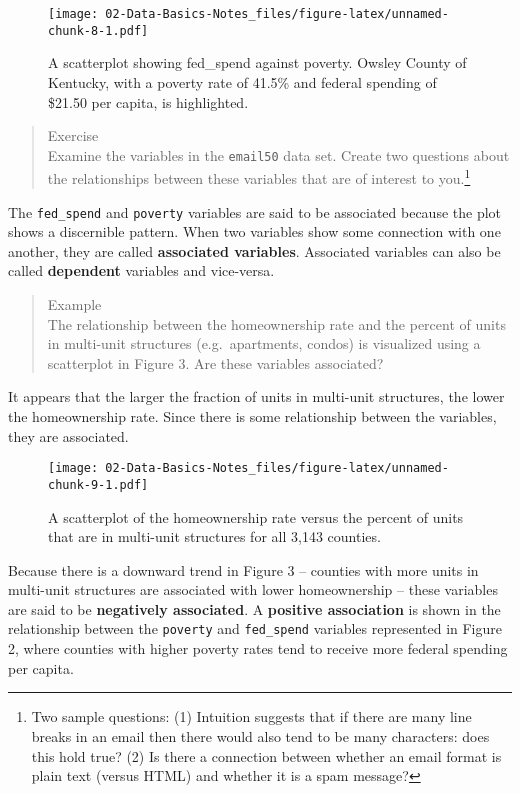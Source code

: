 \documentclass[
]{article}
\begin{document}
\begin{figure}
\centering
\texttt{[image: 02-Data-Basics-Notes\_files/figure-latex/unnamed-chunk-8-1.pdf]}
\caption{A scatterplot showing fed\_spend against poverty. Owsley County
of Kentucky, with a poverty rate of 41.5\% and federal spending of
\$21.50 per capita, is highlighted.}
\end{figure}

\begin{quote}
Exercise\\
Examine the variables in the \texttt{email50} data set. Create two
questions about the relationships between these variables that are of
interest to you.\footnote{Two sample questions: (1) Intuition suggests
  that if there are many line breaks in an email then there would also
  tend to be many characters: does this hold true? (2) Is there a
  connection between whether an email format is plain text (versus HTML)
  and whether it is a spam message?}
\end{quote}

The \texttt{fed\_spend} and \texttt{poverty} variables are said to be
associated because the plot shows a discernible pattern. When two
variables show some connection with one another, they are called
\textbf{associated variables}. Associated variables can also be called
\textbf{dependent} variables and vice-versa.

\begin{quote}
Example\\
The relationship between the homeownership rate and the percent of units
in multi-unit structures (e.g.~apartments, condos) is visualized using a
scatterplot in Figure 3. Are these variables associated?
\end{quote}

It appears that the larger the fraction of units in multi-unit
structures, the lower the homeownership rate. Since there is some
relationship between the variables, they are associated.

\begin{figure}
\centering
\texttt{[image: 02-Data-Basics-Notes\_files/figure-latex/unnamed-chunk-9-1.pdf]}
\caption{A scatterplot of the homeownership rate versus the percent of
units that are in multi-unit structures for all 3,143 counties.}
\end{figure}

Because there is a downward trend in Figure 3 -- counties with more
units in multi-unit structures are associated with lower homeownership
-- these variables are said to be \textbf{negatively associated}. A
\textbf{positive association} is shown in the relationship between the
\texttt{poverty} and \texttt{fed\_spend} variables represented in Figure
2, where counties with higher poverty rates tend to receive more federal
spending per capita.
\end{document}

